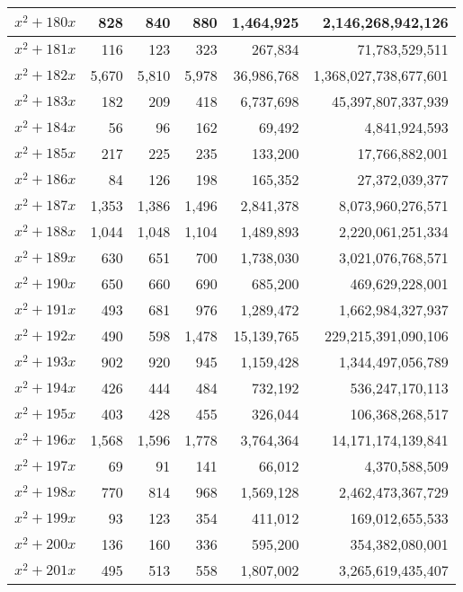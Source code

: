 \documentclass{article}
\begin{document}
\begin{center}
\begin{tabular}{ | c | r | r | r | r | r | }
$x^2 + 180x$ & 828 & 840 & 880 & 1{,}464{,}925 & 2{,}146{,}268{,}942{,}126 \\ \hline
$x^2 + 181x$ & 116 & 123 & 323 & 267{,}834 & 71{,}783{,}529{,}511 \\ \hline
$x^2 + 182x$ & 5{,}670 & 5{,}810 & 5{,}978 & 36{,}986{,}768 & 1{,}368{,}027{,}738{,}677{,}601 \\ \hline
$x^2 + 183x$ & 182 & 209 & 418 & 6{,}737{,}698 & 45{,}397{,}807{,}337{,}939 \\ \hline
$x^2 + 184x$ & 56 & 96 & 162 & 69{,}492 & 4{,}841{,}924{,}593 \\ \hline
$x^2 + 185x$ & 217 & 225 & 235 & 133{,}200 & 17{,}766{,}882{,}001 \\ \hline
$x^2 + 186x$ & 84 & 126 & 198 & 165{,}352 & 27{,}372{,}039{,}377 \\ \hline
$x^2 + 187x$ & 1{,}353 & 1{,}386 & 1{,}496 & 2{,}841{,}378 & 8{,}073{,}960{,}276{,}571 \\ \hline
$x^2 + 188x$ & 1{,}044 & 1{,}048 & 1{,}104 & 1{,}489{,}893 & 2{,}220{,}061{,}251{,}334 \\ \hline
$x^2 + 189x$ & 630 & 651 & 700 & 1{,}738{,}030 & 3{,}021{,}076{,}768{,}571 \\ \hline
$x^2 + 190x$ & 650 & 660 & 690 & 685{,}200 & 469{,}629{,}228{,}001 \\ \hline
$x^2 + 191x$ & 493 & 681 & 976 & 1{,}289{,}472 & 1{,}662{,}984{,}327{,}937 \\ \hline
$x^2 + 192x$ & 490 & 598 & 1{,}478 & 15{,}139{,}765 & 229{,}215{,}391{,}090{,}106 \\ \hline
$x^2 + 193x$ & 902 & 920 & 945 & 1{,}159{,}428 & 1{,}344{,}497{,}056{,}789 \\ \hline
$x^2 + 194x$ & 426 & 444 & 484 & 732{,}192 & 536{,}247{,}170{,}113 \\ \hline
$x^2 + 195x$ & 403 & 428 & 455 & 326{,}044 & 106{,}368{,}268{,}517 \\ \hline
$x^2 + 196x$ & 1{,}568 & 1{,}596 & 1{,}778 & 3{,}764{,}364 & 14{,}171{,}174{,}139{,}841 \\ \hline
$x^2 + 197x$ & 69 & 91 & 141 & 66{,}012 & 4{,}370{,}588{,}509 \\ \hline
$x^2 + 198x$ & 770 & 814 & 968 & 1{,}569{,}128 & 2{,}462{,}473{,}367{,}729 \\ \hline
$x^2 + 199x$ & 93 & 123 & 354 & 411{,}012 & 169{,}012{,}655{,}533 \\ \hline
$x^2 + 200x$ & 136 & 160 & 336 & 595{,}200 & 354{,}382{,}080{,}001 \\ \hline
$x^2 + 201x$ & 495 & 513 & 558 & 1{,}807{,}002 & 3{,}265{,}619{,}435{,}407 \\ \hline

\end{tabular}
\end{center}
\end{document}

